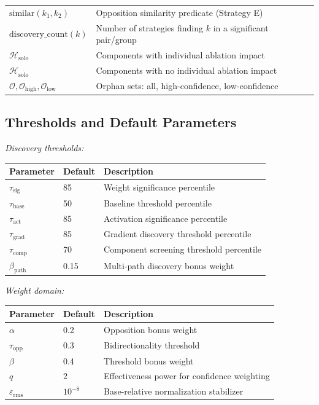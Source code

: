 \documentclass[11pt]{article}
\begin{document}
\begin{center}
\begin{tabular}{ll}
$\text{similar}(k_1, k_2)$ & Opposition similarity predicate (Strategy E) \\
$\text{discovery\_count}(k)$ & Number of strategies finding $k$ in a significant pair/group \\
$\mathcal{H}_{\text{solo}}$ & Components with individual ablation impact \\
$\mathcal{H}_{\overline{\text{solo}}}$ & Components with no individual ablation impact \\
$\mathcal{O}, \mathcal{O}_{\text{high}}, \mathcal{O}_{\text{low}}$ & Orphan sets: all, high-confidence, low-confidence \\
\bottomrule
\end{tabular}
\end{center}

\subsection{Thresholds and Default Parameters}
\label{app:notation-thresholds-default-parameters}

\noindent\textit{Discovery thresholds:}
\begin{center}
\begin{tabular}{llp{}}
\toprule
\textbf{Parameter} & \textbf{Default} & \textbf{Description} \\
\midrule
$\tau_{\text{sig}}$ & 85 & Weight significance percentile \\
$\tau_{\text{base}}$ & 50 & Baseline threshold percentile \\
$\tau_{\text{act}}$ & 85 & Activation significance percentile \\
$\tau_{\text{grad}}$ & 85 & Gradient discovery threshold percentile \\
$\tau_{\text{comp}}$ & 70 & Component screening threshold percentile \\
$\beta_{\text{path}}$ & 0.15 & Multi-path discovery bonus weight \\
\bottomrule
\end{tabular}
\end{center}

\noindent\textit{Weight domain:}
\begin{center}
\begin{tabular}{llp{}}
\toprule
\textbf{Parameter} & \textbf{Default} & \textbf{Description} \\
\midrule
$\alpha$ & 0.2 & Opposition bonus weight \\
$\tau_{\text{opp}}$ & 0.3 & Bidirectionality threshold \\
$\beta$ & 0.4 & Threshold bonus weight \\
$q$ & 2 & Effectiveness power for confidence weighting \\
$\varepsilon_{\text{rms}}$ & $10^{-8}$ & Base-relative normalization stabilizer \\
\bottomrule
\end{tabular}
\end{center}
\end{document}
